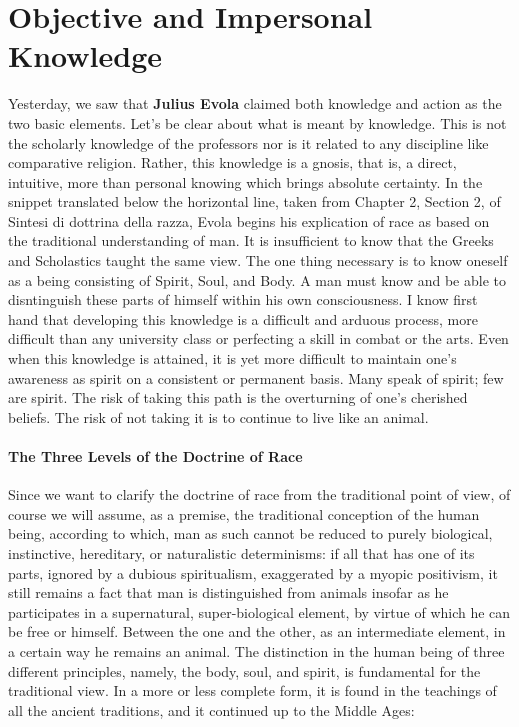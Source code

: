 \section{Objective and Impersonal Knowledge}

Yesterday, we saw that \textbf{Julius Evola} claimed both knowledge and action as the two basic elements. Let's be clear about what is meant by knowledge. This is not the scholarly knowledge of the professors nor is it related to any discipline like comparative religion. Rather, this knowledge is a gnosis, that is, a direct, intuitive, more than personal knowing which brings absolute certainty. In the snippet translated below the horizontal line, taken from Chapter 2, Section 2, of Sintesi di dottrina della razza, Evola begins his explication of race as based on the traditional understanding of man. It is insufficient to know that the Greeks and Scholastics taught the same view. The one thing necessary is to know oneself as a being consisting of Spirit, Soul, and Body. A man must know and be able to disntinguish these parts of himself within his own consciousness. I know first hand that developing this knowledge is a difficult and arduous process, more difficult than any university class or perfecting a skill in combat or the arts. Even when this knowledge is attained, it is yet more difficult to maintain one's awareness as spirit on a consistent or permanent basis. Many speak of spirit; few are spirit. The risk of taking this path is the overturning of one's cherished beliefs. The risk of not taking it is to continue to live like an animal.

\paragraph{The Three Levels of the Doctrine of Race}

Since we want to clarify the doctrine of race from the traditional point of view, of course we will assume, as a premise, the traditional conception of the human being, according to which, man as such cannot be reduced to purely biological, instinctive, hereditary, or naturalistic determinisms: if all that has one of its parts, ignored by a dubious spiritualism, exaggerated by a myopic positivism, it still remains a fact that man is distinguished from animals insofar as he participates in a supernatural, super-biological element, by virtue of which he can be free or himself. Between the one and the other, as an intermediate element, in a certain way he remains an animal. The distinction in the human being of three different principles, namely, the body, soul, and spirit, is fundamental for the traditional view. In a more or less complete form, it is found in the teachings of all the ancient traditions, and it continued up to the Middle Ages:

